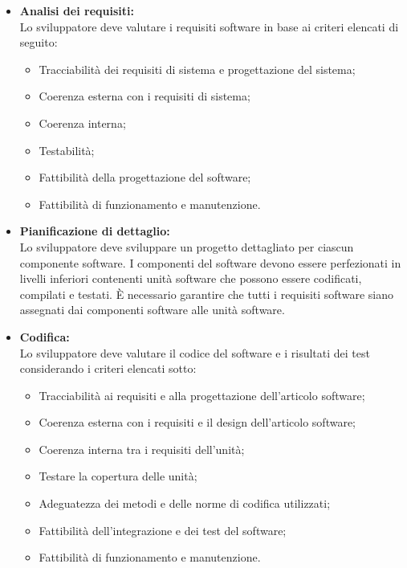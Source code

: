 \begin{itemize}
    \item \textbf{Analisi dei requisiti:} \\
    Lo sviluppatore deve valutare i requisiti software in base ai criteri elencati di seguito:
        \begin{itemize}
            \item Tracciabilità dei requisiti di sistema e progettazione del sistema;
            \item Coerenza esterna con i requisiti di sistema;
            \item Coerenza interna;
            \item Testabilità;
            \item Fattibilità della progettazione del software;
            \item Fattibilità di funzionamento e manutenzione.
        \end{itemize}
    \item \textbf{Pianificazione di dettaglio:} \\
    Lo sviluppatore deve sviluppare un progetto dettagliato per ciascun componente software. I componenti del software 
    devono essere perfezionati in livelli inferiori contenenti unità software che possono essere codificati, compilati 
    e testati. È necessario garantire che tutti i requisiti software siano assegnati dai componenti software 
    alle unità software.
    
    \item \textbf{Codifica:} \\
    Lo sviluppatore deve valutare il codice del software e i risultati dei test considerando i criteri elencati sotto:
    \begin{itemize}
        \item Tracciabilità ai requisiti e alla progettazione dell'articolo software;
        \item Coerenza esterna con i requisiti e il design dell'articolo software;
        \item Coerenza interna tra i requisiti dell'unità;
        \item Testare la copertura delle unità;
        \item Adeguatezza dei metodi e delle norme di codifica utilizzati;
        \item Fattibilità dell'integrazione e dei test del software;
        \item Fattibilità di funzionamento e manutenzione.   
    \end{itemize}
\end{itemize}

